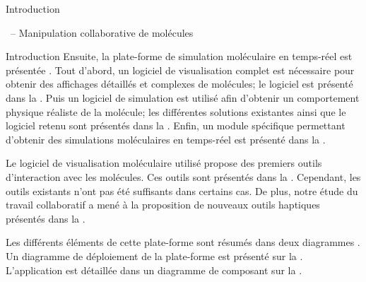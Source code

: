 \documentclass[myfrancais]{mythesis}
\begin{document}
\begin{mypart}{Introduction}
\begin{mychapter}{\myShaddock\ -- Manipulation collaborative de molécules}
\begin{mysection}{Introduction}
				Ensuite, la plate-forme de simulation moléculaire en temps-réel est présentée .
				Tout d'abord, un logiciel de visualisation complet est nécessaire pour obtenir des affichages détaillés et complexes de molécules; le logiciel est présenté dans la .
				Puis un logiciel de simulation est utilisé afin d'obtenir un comportement physique réaliste de la molécule; les différentes solutions existantes ainsi que le logiciel retenu sont présentés dans la .
				Enfin, un module spécifique permettant d'obtenir des simulations moléculaires en temps-réel est présenté dans la .

				Le logiciel de visualisation moléculaire utilisé propose des premiers outils d'interaction avec les molécules.
				Ces outils sont présentés dans la .
				Cependant, les outils existants n'ont pas été suffisants dans certains cas.
				De plus, notre étude du travail collaboratif a mené à la proposition de nouveaux outils haptiques présentés dans la .

				Les différents éléments de cette plate-forme sont résumés dans deux diagrammes .
				Un diagramme de déploiement  de la plate-forme \myShaddock est présenté sur la .
				L'application  est détaillée dans un diagramme de composant  sur la .


\end{mysection}
\end{mychapter}
\end{mypart}
\end{document}
